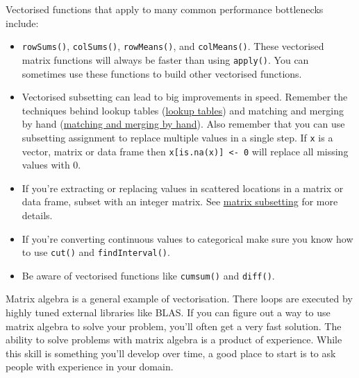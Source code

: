 Vectorised functions that apply to many common performance bottlenecks
include:

\begin{itemize}
\item
  \texttt{rowSums()}, \texttt{colSums()}, \texttt{rowMeans()}, and
  \texttt{colMeans()}. These vectorised matrix functions will always be
  faster than using \texttt{apply()}. You can sometimes use these
  functions to build other vectorised functions.

\begin{Shaded}
\begin{Highlighting}[]
\StringTok{ }\StringTok{ }
\StringTok{ }\StringTok{ }
\end{Highlighting}
\end{Shaded}
\item
  Vectorised subsetting can lead to big improvements in speed. Remember
  the techniques behind lookup tables (\hyperref[lookup-tables]{lookup
  tables}) and matching and merging by hand
  (\hyperref[matching-merging]{matching and merging by hand}). Also
  remember that you can use subsetting assignment to replace multiple
  values in a single step. If \texttt{x} is a vector, matrix or data
  frame then \texttt{x{[}is.na(x){]} \textless{}- 0} will replace all
  missing values with 0.
\item
  If you're extracting or replacing values in scattered locations in a
  matrix or data frame, subset with an integer matrix. See
  \hyperref[matrix-subsetting]{matrix subsetting} for more details.
\item
  If you're converting continuous values to categorical make sure you
  know how to use \texttt{cut()} and \texttt{findInterval()}.
\item
  Be aware of vectorised functions like \texttt{cumsum()} and
  \texttt{diff()}.
\end{itemize}

Matrix algebra is a general example of vectorisation. There loops are
executed by highly tuned external libraries like BLAS. If you can figure
out a way to use matrix algebra to solve your problem, you'll often get
a very fast solution. The ability to solve problems with matrix algebra
is a product of experience. While this skill is something you'll develop
over time, a good place to start is to ask people with experience in
your domain. 

